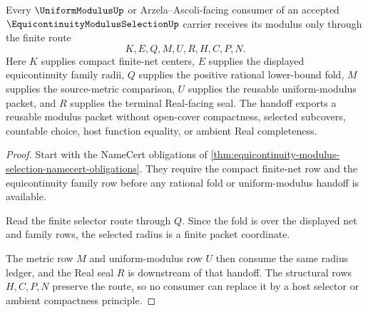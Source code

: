 \begin{theorem}
\label{thm:equicontinuity-modulus-selection-finite-net-handoff}
Every $\UniformModulusUp$ or Arzela--Ascoli-facing consumer of an accepted $\EquicontinuityModulusSelectionUp$ carrier receives its modulus only through the finite route
$$
K,E,Q,M,U,R,H,C,P,N .
$$
Here $K$ supplies compact finite-net centers, $E$ supplies the displayed equicontinuity family radii, $Q$ supplies the positive rational lower-bound fold, $M$ supplies the source-metric comparison, $U$ supplies the reusable uniform-modulus packet, and $R$ supplies the terminal Real-facing seal. The handoff exports a reusable modulus packet without open-cover compactness, selected subcovers, countable choice, host function equality, or ambient Real completeness.
\end{theorem}
\begin{proof}
Start with the NameCert obligations of \autoref{thm:equicontinuity-modulus-selection-namecert-obligations}. They require the compact finite-net row and the equicontinuity family row before any rational fold or uniform-modulus handoff is available.

Read the finite selector route through $Q$. Since the fold is over the displayed net and family rows, the selected radius is a finite packet coordinate.

The metric row $M$ and uniform-modulus row $U$ then consume the same radius ledger, and the Real seal $R$ is downstream of that handoff. The structural rows $H,C,P,N$ preserve the route, so no consumer can replace it by a host selector or ambient compactness principle.
\end{proof}




